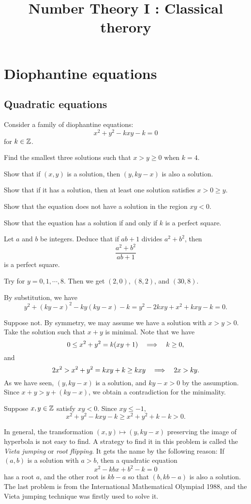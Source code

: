 \documentclass{../prb}
\title{Number Theory I : Classical therory}
\begin{document}
\maketitle
\tableofcontents

\chapter{Diophantine equations}

\section{Quadratic equations}


\begin{prb}
Consider a family of diophantine equations:
\[x^2+y^2-kxy-k=0\]
for $k\in\mathbb{Z}$.
\begin{cond}
\item Find the smallest three solutions such that $x>y\ge0$ when $k=4$.
\item Show that if $(x,y)$ is a solution, then $(y,ky-x)$ is also a solution.
\item Show that if it has a solution, then at least one solution satisfies $x>0\ge y$.
\item Show that the equation does not have a solution in the region $xy<0$.
\item Show that the equation has a solution if and only if $k$ is a perfect square.
\item Let $a$ and $b$ be integers. Deduce that if $ab+1$ divides $a^2+b^2$, then \[\frac{a^2+b^2}{ab+1}\]is a perfect square.
\end{cond}
\end{prb}
\begin{sol}
\item
Try for $y=0,1,\cdots,8$.
Then we get $(2,0)$, $(8,2)$, and $(30,8)$.
\item
By substitution, we have
\[y^2+(ky-x)^2-ky(ky-x)-k=y^2-2kxy+x^2+kxy-k=0.\]
\item
Suppose not.
By symmetry, we may assume we have a solution with $x>y>0$.
Take the solution such that $x+y$ is minimal.
Note that we have
\[0\le x^2+y^2=k(xy+1)\impl k\ge0,\]
and
\[2x^2>x^2+y^2=kxy+k\ge kxy\impl 2x>ky.\]
As we have seen, $(y,ky-x)$ is a solution, and $ky-x>0$ by the assumption.
Since $x+y>y+(ky-x)$, we obtain a contradiction for the minimality.
\item
Suppose $x,y\in\mathbb{Z}$ satisfy $xy<0$.
Since $xy\le-1$, \[x^2+y^2-kxy-k\ge x^2+y^2+k-k>0.\]
\item
\end{sol}
\begin{note}
In general, the transformation $(x,y)\mapsto(y,ky-x)$ preserving the image of hyperbola is not easy to find.
A strategy to find it in this problem is called the \emph{Vieta jumping} or \emph{root flipping}.
It gets the name by the following reason:
If $(a,b)$ is a solution with $a>b$, then a quadratic equation \[x^2-kbx+b^2-k=0\] has a root $a$, and the other root is $kb-a$ so that $(b,kb-a)$ is also a solution.
The last problem is from the International Mathematical Olympiad 1988, and the Vieta jumping technique was firstly used to solve it.
\end{note}
\end{document}

